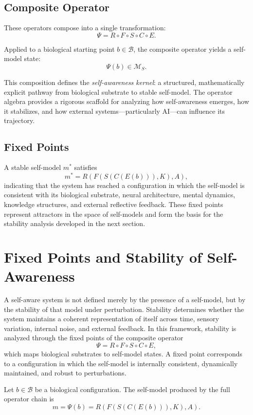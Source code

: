 \documentclass[12pt]{article}
\begin{document}
\subsection*{Composite Operator}

These operators compose into a single transformation:
\[
\Psi = R \circ F \circ S \circ C \circ E.
\]

Applied to a biological starting point $b \in \mathcal{B}$, the composite operator yields a self-model state:
\[
\Psi(b) \in \mathcal{M}_S.
\]

This composition defines the \textit{self-awareness kernel}: a structured, mathematically explicit pathway from biological substrate to stable self-model. The operator algebra provides a rigorous scaffold for analyzing how self-awareness emerges, how it stabilizes, and how external systems—particularly AI—can influence its trajectory.

\subsection*{Fixed Points}

A stable self-model $m^*$ satisfies
\[
m^* = R(F(S(C(E(b))), K), A),
\]
indicating that the system has reached a configuration in which the self-model is consistent with its biological substrate, neural architecture, mental dynamics, knowledge structures, and external reflective feedback. These fixed points represent attractors in the space of self-models and form the basis for the stability analysis developed in the next section.

\section{Fixed Points and Stability of Self-Awareness}

A self-aware system is not defined merely by the presence of a self-model, but by the stability of that model under perturbation. Stability determines whether the system maintains a coherent representation of itself across time, sensory variation, internal noise, and external feedback. In this framework, stability is analyzed through the fixed points of the composite operator
\[
\Psi = R \circ F \circ S \circ C \circ E,
\]
which maps biological substrates to self-model states. A fixed point corresponds to a configuration in which the self-model is internally consistent, dynamically maintained, and robust to perturbations.

Let $b \in \mathcal{B}$ be a biological configuration. The self-model produced by the full operator chain is
\[
m = \Psi(b) = R(F(S(C(E(b))), K), A).
\]
\end{document}
